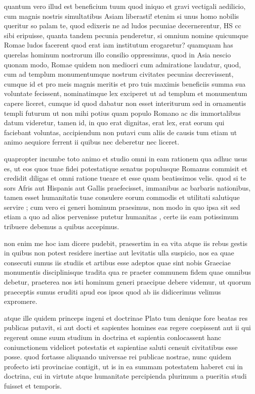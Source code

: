  quantum vero illud est beneficium tuum quod iniquo et gravi vectigali aedilicio, cum magnis nostris simultatibus Asiam liberasti! etenim si unus homo nobilis queritur so palam te, quod edixeris ne ad ludos pecuniae decernerentur, HS cc sibi eripuisse, quanta tandem pecunia penderetur, si omnium nomine quicumque Romae ludos facerent quod erat iam institutum erogaretur? quamquam has querelas hominum nostrorum illo consilio oppressimus, quod in Asia nescio quonam modo, Romae quidem non mediocri cum admiratione laudatur, quod, cum ad templum monumentumque nostrum civitates pecunias decrevissent, cumque id et pro meis magnis meritis et pro tuis maximis beneficiis summa sua voluntate fecissent, nominatimque lex exciperet ut ad templum et monumentum capere liceret, cumque id quod dabatur non esset interiturum sed in ornamentis templi futurum ut non mihi potius quam populo Romano ac dis immortalibus datum videretur, tamen id, in quo erat dignitas, erat lex, erat eorum qui faciebant voluntas, accipiendum non putavi cum aliis de causis tum etiam ut animo aequiore ferrent ii quibus nec deberetur nec liceret.

 quapropter incumbe toto animo et studio omni in eam rationem qua adhuc usus es, ut eos quos tuae fidei potestatique senatus populusque Romanus commisit et credidit diligas et omni ratione tueare et esse quam beatissimos velis. quod si te sors Afris aut Hispanis aut Gallis praefecisset, immanibus ac barbaris nationibus, tamen esset humanitatis tuae consulere eorum commodis et utilitati salutique servire ; cum vero ei generi hominum praesimus, non modo in quo ipsa sit sed etiam a quo ad alios pervenisse putetur humanitas , certe iis eam potissimum tribuere debemus a quibus accepimus.

 non enim me hoc iam dicere pudebit, praesertim in ea vita atque iis rebus gestis in quibus non potest residere inertiae aut levitatis ulla suspicio, nos ea quae consecuti sumus iis studiis et artibus esse adeptos quae sint nobis Graeciae monumentis disciplinisque tradita qua re praeter communem fidem quae omnibus debetur, praeterea nos isti hominum generi praecipue debere videmur, ut quorum praeceptis sumus eruditi apud eos ipsos quod ab iis didicerimus velimus expromere.

 atque ille quidem princeps ingeni et doctrinae Plato tum denique fore beatas res publicas putavit, si aut docti et sapientes homines eas regere coepissent aut ii qui regerent omne suum studium in doctrina et sapientia conlocassent hanc coniunctionem videlicet potestatis et sapientiae saluti censuit civitatibus esse posse. quod fortasse aliquando universae rei publicae nostrae, nunc quidem profecto isti provinciae contigit, ut is in ea summam potestatem haberet cui in doctrina, cui in virtute atque humanitate percipienda plurimum a pueritia studi fuisset et temporis.

